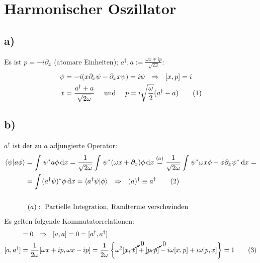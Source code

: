 \documentclass[a4paper,12pt]{article}
\newcommand\numberthis{\addtocounter{equation}{1}\tag{\theequation}}
\newcommand{\brak}{}
\newcommand{\intx}{}
\newcommand{\klammer}{}
\begin{document}
\section{Harmonischer Oszillator}
\subsection*{a)}
Es ist $p=-i\partial_x$ (atomare Einheiten); $a^\dagger,a:=\frac{\omega x\mp ip}{\sqrt{2\omega}}$:
\begin{align*}
[x,p]\psi&=-i(x\partial_x\psi-\partial_xx\psi)=i\psi\ \ \Rightarrow\ \ [x,p]=i\\
x&=\frac{a^\dagger+a}{\sqrt{2\omega}}\ \ \ \ \mathrm{und}\ \ \ \ p=i\sqrt{\frac{\omega}{2}}(a^\dagger-a)\numberthis\label{x und p von a und a dagger}
\end{align*}
\subsection*{b)}
$a^\dagger$ ist der zu $a$ adjungierte Operator:
\begin{align*}
\brak\langle {\psi}| {a\phi}\rangle&=\intx\int_{ }^{ }\psi^\ast a\phi\,\mathrm{d}x=\frac{1}{\sqrt{2\omega}}\intx\int_{ }^{ }\psi^\ast (\omega x+\partial_x)\phi\,\mathrm{d}x\overset{(a)}{=}\frac{1}{\sqrt{2\omega}}\intx\int_{ }^{ }\psi^\ast \omega x\phi - \phi\partial_x\psi^\ast \,\mathrm{d}x= \\
&= \intx\int_{ }^{ }(a^\dagger\psi)^\ast\phi\,\mathrm{d}x=\brak\langle {a^\dagger\psi}| {\phi}\rangle\ \ \Rightarrow\ \ (a)^\dagger\equiv a^\dagger\numberthis\label{a dagger}\\
&\ \\
&\ (a):\ \text{Partielle Integration, Randterme verschwinden}
\end{align*}
Es gelten folgende Kommutatorrelationen:
\begin{align*}
[A,A]&=0\ \ \Rightarrow\ \ [a,a]=0=[a^\dagger, a^\dagger] \\
[a,a^\dagger]&=\frac{1}{2\omega}[\omega x+ip, \omega x-ip]=\frac{1}{2\omega}\klammer\left\{ {\omega^2\cancelto{0}{[x,x]}+\cancelto{0}{[p,p]}-i\omega [x,p]+i\omega [p,x]} \right\}=1\numberthis\label{[a, a dagger]}
\end{align*}
\end{document}
